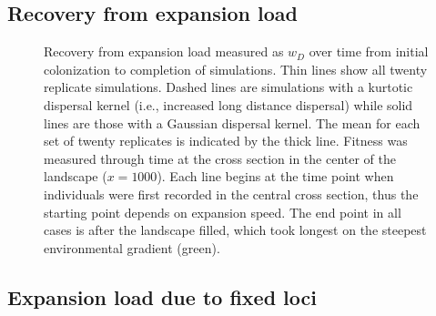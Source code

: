 \newpage{}




\subsection*{Recovery from expansion load}


\begin{figure}[h!]
\centering
{}
\caption[ ~ - Recovery from expansion load.]{Recovery from expansion load measured as $w_D$ over time from initial colonization to completion of simulations. Thin lines show all twenty replicate simulations. Dashed lines are simulations with a kurtotic dispersal kernel (i.e., increased long distance dispersal) while solid lines are those with a Gaussian dispersal kernel. The mean for each set of twenty replicates is indicated by the thick line. Fitness was measured through time at the cross section in the center of the landscape ($x = 1000$). Each line begins at the time point when individuals were first recorded in the central cross section, thus the starting point depends on expansion speed. The end point in all cases is after the landscape filled, which took longest on the steepest environmental gradient (green).}
\label{fig:recovery}
\end{figure}


\newpage{}




\subsection{Expansion load due to fixed loci}



